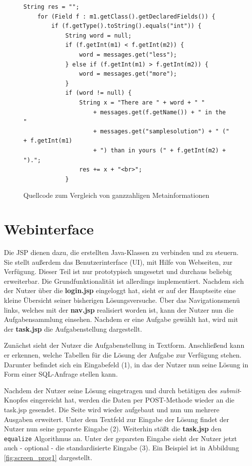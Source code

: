 \begin{figure}[h]
\lstset{language=Java,tabsize=2}
\begin{lstlisting}
String res = "";
	for (Field f : m1.getClass().getDeclaredFields()) {
		if (f.getType().toString().equals("int")) {
			String word = null;
			if (f.getInt(m1) < f.getInt(m2)) {
				word = messages.get("less");
			} else if (f.getInt(m1) > f.getInt(m2)) {
				word = messages.get("more");
			}
			if (word != null) {
				String x = "There are " + word + " "
					+ messages.get(f.getName()) + " in the "
					+ messages.get("samplesolution") + " (" + f.getInt(m1)
					+ ") than in yours (" + f.getInt(m2) + ").";
				res += x + "<br>";
			}
\end{lstlisting}
\caption{Quellcode zum Vergleich von ganzzahligen Metainformationen}
\label{fig:comparecode}
\end{figure}

\section{Webinterface}
\label{sec:webinterface}

Die JSP dienen dazu, die erstellten Java-Klassen zu verbinden und zu steuern. Sie stellt außerdem das Benutzerinterface (UI), mit Hilfe von Webseiten, zur Verfügung. Dieser Teil ist nur prototypisch umgesetzt und durchaus beliebig erweiterbar. Die Grundfunktionalität ist allerdings implementiert. Nachdem sich der Nutzer über die \textbf{login.jsp} eingeloggt hat, sieht er auf der Hauptseite eine kleine Übersicht seiner bisherigen Lösungsversuche. Über das Navigationsmenü links, welches mit der \textbf{nav.jsp} realisiert worden ist, kann der Nutzer nun die Aufgabensammlung einsehen. Nachdem er eine Aufgabe gewählt hat, wird mit der \textbf{task.jsp} die Aufgabenstellung dargestellt.

Zunächst sieht der Nutzer die Aufgabenstellung in Textform. Anschließend kann er erkennen, welche Tabellen für die Lösung der Aufgabe zur Verfügung stehen. Darunter befindet sich ein Eingabefeld (1), in das der Nutzer nun seine Lösung in Form einer SQL-Anfrage stellen kann.

Nachdem der Nutzer seine Lösung eingetragen und durch betätigen des \textit{submit}-Knopfes eingereicht hat, werden die Daten per POST-Methode wieder an die task.jsp gesendet. Die Seite wird wieder aufgebaut und nun um mehrere Ausgaben erweitert. Unter dem Textfeld zur Eingabe der Lösung findet der Nutzer nun seine geparste Eingabe (2). Weiterhin stößt die \textbf{task.jsp} den \verb|equalize| Algorithmus an. Unter der geparsten Eingabe sieht der Nutzer jetzt auch - optional - die standardisierte Eingabe (3). Ein Beispiel ist in Abbildung \ref{fig:screen_prog1} dargestellt.

